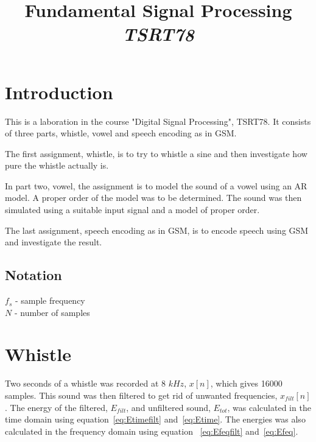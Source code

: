 \documentclass[10pt]{article}
\title{Fundamental Signal Processing\\
\emph{TSRT78}}
\begin{document}


\maketitle

\newpage
\tableofcontents
\newpage

\section{Introduction}
This is a laboration in the course "Digital Signal Processing", TSRT78.
It consists of three parts, whistle, vowel and speech encoding as in GSM.

The first assignment, whistle, is to try to whistle a sine and then
investigate how pure the whistle actually is.

In part two, vowel, the assignment is to model the sound of a vowel
using an AR model. A proper order of the model was to be determined.
The sound was then simulated using a suitable input signal and a
model of proper order.

The last assignment, speech encoding as in GSM, is to encode speech
using GSM and investigate the result.

\subsection{Notation}
$f_s$ - sample frequency\\
$N$ - number of samples

\section{Whistle}
Two seconds of a whistle was recorded at 8 $kHz$, $x[n]$, which gives 16000 samples.
This sound was then filtered to get rid of unwanted frequencies, $x_{filt}[n]$.
The energy of the filtered, $E_{filt}$, and unfiltered sound, $E_{tot}$,
was calculated in the time domain using equation~\ref{eq:Etimefilt}
and~\ref{eq:Etime}. The energies was also calculated in the frequency
domain using equation ~\ref{eq:Efeqfilt} and~\ref{eq:Efeq}.
\end{document}
